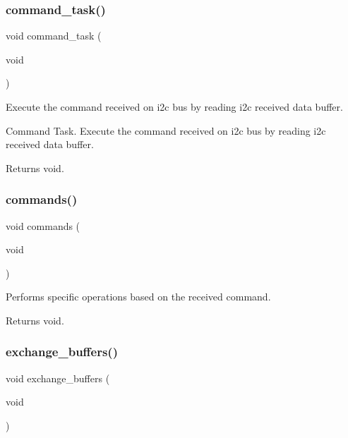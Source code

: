 \subsubsection{\texorpdfstring{command\+\_\+task()}{command\_task()}}
{\footnotesize\ttfamily void command\+\_\+task (\begin{DoxyParamCaption}\item[{void}]{ }\end{DoxyParamCaption})}



Execute the command received on i2c bus by reading i2c received data buffer. 

Command Task. Execute the command received on i2c bus by reading i2c received data buffer.

\begin{DoxyReturn}{Returns}
void. 
\end{DoxyReturn}
\mbox{\label{i2c-rain_8ino_a4981066e183f1432ffd6eddf55826585}} 
\subsubsection{\texorpdfstring{commands()}{commands()}}
{\footnotesize\ttfamily void commands (\begin{DoxyParamCaption}\item[{void}]{ }\end{DoxyParamCaption})}



Performs specific operations based on the received command. 

\begin{DoxyReturn}{Returns}
void. 
\end{DoxyReturn}
\mbox{\label{i2c-rain_8ino_a46696a96b3118b5d8900703c054166c8}} 
\subsubsection{\texorpdfstring{exchange\+\_\+buffers()}{exchange\_buffers()}}
{\footnotesize\ttfamily void exchange\+\_\+buffers (\begin{DoxyParamCaption}\item[{void}]{ }\end{DoxyParamCaption})}



